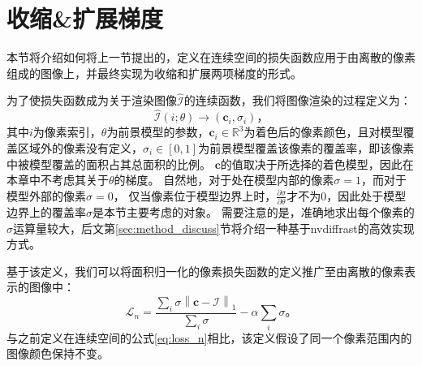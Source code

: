 \section{收缩\&扩展梯度}

本节将介绍如何将上一节提出的，定义在连续空间的损失函数应用于由离散的像素组成的图像上，并最终实现为收缩和扩展两项梯度的形式。

为了使损失函数成为关于渲染图像$\hat{\mathcal{I}}$的连续函数，我们将图像渲染的过程定义为：
\begin{equation}
\hat{\mathcal{I}}(i;\theta) \to (\mathbf{c}_i, \sigma_i)
\text{，}
\end{equation}
其中$i$为像素索引，$\theta$为前景模型的参数，$\mathbf{c}_i\in\mathbb{R}^3$为着色后的像素颜色，且对模型覆盖区域外的像素没有定义，$\sigma_i\in[0,1]$为前景模型覆盖该像素的覆盖率，即该像素中被模型覆盖的面积占其总面积的比例。
$\mathbf{c}$的值取决于所选择的着色模型，因此在本章中不考虑其关于$\theta$的梯度。
自然地，对于处在模型内部的像素$\sigma=1$，而对于模型外部的像素$\sigma=0$，
仅当像素位于模型边界上时，$\frac{\partial\sigma}{\partial\theta}$才不为0，因此处于模型边界上的覆盖率$\sigma$是本节主要考虑的对象。
需要注意的是，准确地求出每个像素的$\sigma$运算量较大，后文第\ref{sec:method_discuss}节将介绍一种基于nvdiffrast的高效实现方式。

基于该定义，我们可以将面积归一化的像素损失函数的定义推广至由离散的像素表示的图像中：
\begin{equation}
\mathcal{L}_n = \frac{\sum_{i} \sigma \left\| \mathbf{c} - \mathcal{I} \right\|_1}
{\sum_{i} \sigma} - \alpha \sum_{i} \sigma
\text{。}
\label{eq:loss_n_pixel}
\end{equation}
与之前定义在连续空间的公式\ref{eq:loss_n}相比，该定义假设了同一个像素范围内的图像颜色保持不变。

